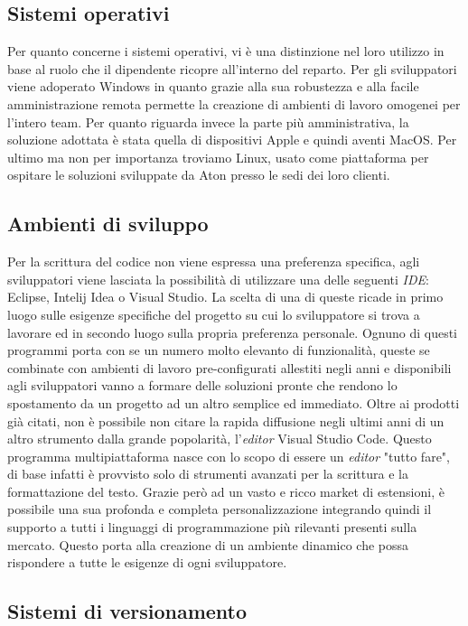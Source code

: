 \subsection{Sistemi operativi}

Per quanto concerne i sistemi operativi, vi è una distinzione nel loro utilizzo in base al ruolo che il dipendente ricopre all'interno del reparto. 
Per gli sviluppatori viene adoperato Windows in quanto grazie alla sua robustezza e alla facile amministrazione remota permette la creazione di ambienti
di lavoro omogenei per l'intero team. Per quanto riguarda invece la parte più amministrativa, la soluzione adottata è stata quella di dispositivi Apple
e quindi aventi MacOS. Per ultimo ma non per importanza troviamo Linux, usato come piattaforma per ospitare le soluzioni sviluppate da Aton presso le sedi
dei loro clienti.

\subsection{Ambienti di sviluppo}

Per la scrittura del codice non viene espressa una preferenza specifica, agli sviluppatori viene lasciata la possibilità di utilizzare una delle seguenti
\emph{IDE}: Eclipse, Intelij Idea o Visual Studio. La scelta di una di queste ricade in primo luogo sulle esigenze specifiche del progetto su cui lo
sviluppatore si trova a lavorare ed in secondo luogo sulla propria preferenza personale. Ognuno di questi programmi porta con se un numero molto elevanto
di funzionalità, queste se combinate con ambienti di lavoro pre-configurati allestiti negli anni e disponibili agli sviluppatori vanno a formare delle
soluzioni pronte che rendono lo spostamento da un progetto ad un altro semplice ed immediato.
Oltre ai prodotti già citati, non è possibile non citare la rapida diffusione negli ultimi anni di un altro strumento dalla grande popolarità, 
l'\emph{editor} Visual Studio Code. 
Questo programma multipiattaforma nasce con lo scopo di essere un \emph{editor} "tutto fare",
di base infatti è provvisto solo di strumenti avanzati per la scrittura e la formattazione del testo. Grazie però ad un vasto e ricco market di estensioni,
è possibile una sua profonda e completa personalizzazione integrando quindi il supporto a tutti i linguaggi di programmazione più rilevanti presenti sulla
mercato. Questo porta alla creazione di un ambiente dinamico che possa rispondere a tutte le esigenze di ogni sviluppatore.

\subsection{Sistemi di versionamento}

